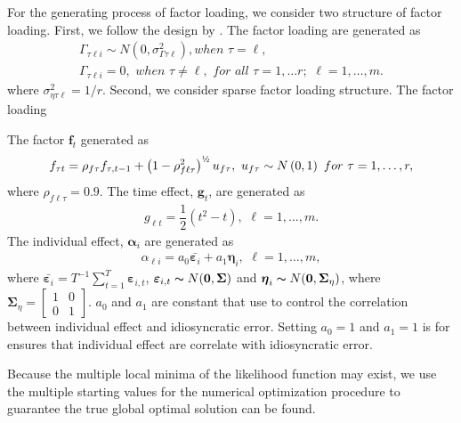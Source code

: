 \documentclass[12pt,a4paper,hyperref]{article}
\begin{document}
For the generating process of factor loading, we consider two structure of factor loading.
First, we follow the design by \citep{Hayakawa:2018}. The factor loading are generated as
\begin{align}
\Gamma_{\tau \ell i}\sim N\left(0,\sigma^{2}_{\Gamma \tau \ell}  \right), when\,\,\tau = \ell , \\
\Gamma_{\tau \ell i}=0 ,\,\, when\,\,\tau \neq \ell, \,\, for \,\, all \,\,\tau=1,\ldots r ;\,\, \ell=1,\ldots, m.
\end{align}
where $\sigma^{2}_{\eta \tau \ell}=1/r$.
Second, we consider sparse factor loading structure. The factor loading

The factor $\boldsymbol{f}_{t}$ generated as
\begin{align}
f_{ \tau t}=\rho_{f \tau} f_{ \tau, t-1}+\left(1- \rho^{2}_{f \ell \tau} \right)^{\text{\textonehalf}}u_{f \tau},\,\, u_{f \tau}\sim N\left(0, 1 \right) \,\,for \,\, \tau=1,\ldots, r,
\end{align}
where $\rho_{f \ell \tau}=0.9$.
The time effect, $\boldsymbol{g}_{t}$, are generated as
\begin{align}
g_{\ell t}=\dfrac{1}{2}\left( t^{2}-t \right), \,\, \ell=1,\ldots, m.
\end{align}
The individual effect, $\boldsymbol{\alpha}_{i}$ are generated as
\begin{align}
\alpha_{\ell i}=a_{0}\bar{\boldsymbol{\varepsilon}_{i}}+a_{1}\boldsymbol{\eta}_{i}, \,\, \ell=1,\ldots, m,
\end{align}
where $\bar{\boldsymbol{\varepsilon}_{i}}=T^{-1}\sum^{T}_{t=1}\boldsymbol{\varepsilon}_{i,t}$, $\boldsymbol{\varepsilon}_{i,t} \thicksim N(\boldsymbol{0}, \boldsymbol{\Sigma})$ and $\boldsymbol{\eta}_{i} \thicksim N(\boldsymbol{0}, \boldsymbol{\Sigma}_{\eta})$, where
$\boldsymbol{\Sigma}_{\eta}=
\begin{bmatrix}
1 & 0 \\
0 & 1
\end{bmatrix}$. $a_{0}$ and $a_{1}$ are constant that use to control the correlation between individual effect and idiosyncratic error. Setting $a_{0}=1$ and $a_{1}=1$ is for ensures that individual effect are correlate with idiosyncratic error.

Because the multiple local minima of the likelihood function may exist, we use the multiple starting values for the numerical optimization procedure to guarantee the true global optimal solution can be found.
\end{document}
